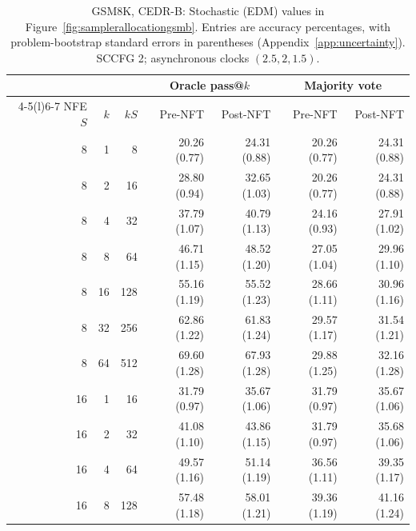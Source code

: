 \documentclass[11pt,letterpaper]{article}
\begin{document}
\begin{table}[p]
\centering\small
\setlength{\tabcolsep}{5pt}
\caption{GSM8K, CEDR-B: Stochastic (EDM) values in Figure~\ref{fig:samplerallocationgsmb}. Entries are accuracy percentages, with problem-bootstrap standard errors in parentheses (Appendix~\ref{app:uncertainty}). SCCFG 2; asynchronous clocks $(2.5,2,1.5)$.}
\label{tab:samplerbudgetgsmbedm}
\begin{tabular}{@{}rrr rrrr@{}}
\toprule
& & & \multicolumn{2}{c}{Oracle pass@$k$} & \multicolumn{2}{c}{Majority vote} \\
\cmidrule(lr){4-5}\cmidrule(l){6-7}
NFE $S$ & $k$ & $kS$ & Pre-NFT & Post-NFT & Pre-NFT & Post-NFT \\
\midrule
8 & 1 & 8 & 20.26 {\scriptsize (0.77)} & 24.31 {\scriptsize (0.88)} & 20.26 {\scriptsize (0.77)} & 24.31 {\scriptsize (0.88)} \\
8 & 2 & 16 & 28.80 {\scriptsize (0.94)} & 32.65 {\scriptsize (1.03)} & 20.26 {\scriptsize (0.77)} & 24.31 {\scriptsize (0.88)} \\
8 & 4 & 32 & 37.79 {\scriptsize (1.07)} & 40.79 {\scriptsize (1.13)} & 24.16 {\scriptsize (0.93)} & 27.91 {\scriptsize (1.02)} \\
8 & 8 & 64 & 46.71 {\scriptsize (1.15)} & 48.52 {\scriptsize (1.20)} & 27.05 {\scriptsize (1.04)} & 29.96 {\scriptsize (1.10)} \\
8 & 16 & 128 & 55.16 {\scriptsize (1.19)} & 55.52 {\scriptsize (1.23)} & 28.66 {\scriptsize (1.11)} & 30.96 {\scriptsize (1.16)} \\
8 & 32 & 256 & 62.86 {\scriptsize (1.22)} & 61.83 {\scriptsize (1.24)} & 29.57 {\scriptsize (1.17)} & 31.54 {\scriptsize (1.21)} \\
8 & 64 & 512 & 69.60 {\scriptsize (1.28)} & 67.93 {\scriptsize (1.28)} & 29.88 {\scriptsize (1.25)} & 32.16 {\scriptsize (1.28)} \\
\midrule
16 & 1 & 16 & 31.79 {\scriptsize (0.97)} & 35.67 {\scriptsize (1.06)} & 31.79 {\scriptsize (0.97)} & 35.67 {\scriptsize (1.06)} \\
16 & 2 & 32 & 41.08 {\scriptsize (1.10)} & 43.86 {\scriptsize (1.15)} & 31.79 {\scriptsize (0.97)} & 35.68 {\scriptsize (1.06)} \\
16 & 4 & 64 & 49.57 {\scriptsize (1.16)} & 51.14 {\scriptsize (1.19)} & 36.56 {\scriptsize (1.11)} & 39.35 {\scriptsize (1.17)} \\
16 & 8 & 128 & 57.48 {\scriptsize (1.18)} & 58.01 {\scriptsize (1.21)} & 39.36 {\scriptsize (1.19)} & 41.16 {\scriptsize (1.24)} \\

\end{tabular}
\end{table}
\end{document}
